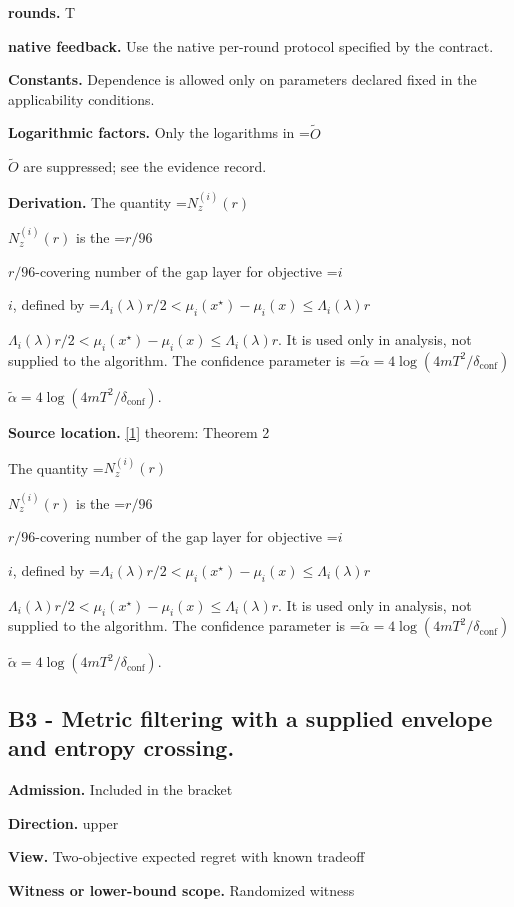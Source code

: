 \documentclass[10pt,a4paper]{article}
\newcommand{\AtlasMath}[1]{\par\begingroup\centering\setbox0=\hbox{$\displaystyle #1$}\ifdim\wd0>1.4\linewidth\typeout{ATLAS WIDE FORMULA: \the\wd0}\fi\ifdim\wd0>\linewidth\resizebox{\linewidth}{!}{\box0}\else\box0\fi\par\endgroup}
\newcommand{\AtlasInlineMath}[1]{\begingroup\setbox0=\hbox{$#1$}\ifdim\wd0>.4\linewidth\endgroup\AtlasMath{#1}\else\endgroup$#1$\fi}
\begin{document}
\textbf{rounds.} T



\textbf{native feedback.} Use the native per-round protocol specified by the contract.



\textbf{Constants.} Dependence is allowed only on parameters declared fixed in the applicability conditions.



\textbf{Logarithmic factors.} Only the logarithms in \AtlasInlineMath{\widetilde O} are suppressed; see the evidence record.



\textbf{Derivation.} The quantity \AtlasInlineMath{N_z^{(i)}(r)} is the \AtlasInlineMath{r/96}-covering number of the gap layer for objective \AtlasInlineMath{i}, defined by \AtlasInlineMath{\Lambda_i(\lambda)r/2<\mu_i(x^\star)-\mu_i(x)\le\Lambda_i(\lambda)r}. It is used only in analysis, not supplied to the algorithm. The confidence parameter is \AtlasInlineMath{\widetilde\alpha=4\log(4mT^2/\delta_{\mathrm{conf}})}.



\textbf{Source location.} \href{https://jmlr.org/papers/volume26/24-1047/24-1047.pdf}{[1]} theorem: Theorem 2



The quantity \AtlasInlineMath{N_z^{(i)}(r)} is the \AtlasInlineMath{r/96}-covering number of the gap layer for objective \AtlasInlineMath{i}, defined by \AtlasInlineMath{\Lambda_i(\lambda)r/2<\mu_i(x^\star)-\mu_i(x)\le\Lambda_i(\lambda)r}. It is used only in analysis, not supplied to the algorithm. The confidence parameter is \AtlasInlineMath{\widetilde\alpha=4\log(4mT^2/\delta_{\mathrm{conf}})}.



\subsection{B3 - Metric filtering with a supplied envelope and entropy crossing.}


\textbf{Admission.} Included in the bracket



\textbf{Direction.} upper



\textbf{View.} Two-objective expected regret with known tradeoff



\textbf{Witness or lower-bound scope.} Randomized witness
\end{document}
